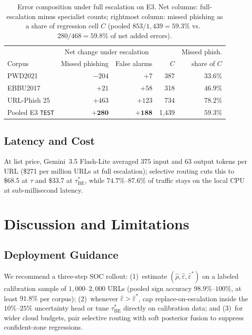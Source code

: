 \documentclass[conference,a4paper]{IEEEtran}
\newcommand{\eps}{\varepsilon}
\newcommand{\rrescue}{\rho}
\begin{document}
\begin{table}[!t]
\caption{Error composition under full escalation on E3. Net columns: full-escalation
minus specialist counts; rightmost column: missed phishing as a share of regression
cell $C$ (pooled $853/1{,}439=59.3\%$ vs.\ $280/468=59.8\%$ of net added errors).}
\label{tab:cell_c}
\centering
\scriptsize
\setlength{\tabcolsep}{3.2pt}
\begin{tabular}{lrrrr}
\toprule
& \multicolumn{2}{c}{Net change under escalation} & & Missed phish. \\
\cmidrule(lr){2-3}
Corpus & Missed phishing & False alarms & $C$ & share of $C$ \\
\midrule
PWD2021 & $-204$ & $+7$ & 387 & $33.6\%$ \\
EBBU2017 & $+21$ & $+58$ & 318 & $46.9\%$ \\
URL-Phish 25 & $+463$ & $+123$ & 734 & $\mathbf{78.2\%}$ \\
\midrule
Pooled E3 \texttt{TEST} & $\mathbf{+280}$ & $\mathbf{+188}$ & 1{,}439 & $59.3\%$ \\
\bottomrule
\end{tabular}
\end{table}

\subsection{Latency and Cost}
At list price, Gemini~3.5 Flash-Lite averaged $375$ input and $63$ output tokens per
URL (\$271 per million URLs at full escalation); selective routing cuts this to
\$68.5 at $\tau$ and \$33.7 at $\tau^{\ast}_{\mathrm{BE}}$, while $74.7\%$--$87.6\%$
of traffic stays on the local CPU at sub-millisecond latency.

\section{Discussion and Limitations}
\label{sec:discussion}
\subsection{Deployment Guidance}
We recommend a three-step SOC rollout: (1)~estimate
$(\hat{\rrescue},\hat{\eps},\hat{\eps}^{\ast})$ on a labeled calibration sample of
$1{,}000$--$2{,}000$ URLs (pooled sign accuracy $98.9\%$--$100\%$, at least $91.8\%$
per corpus); (2)~whenever $\hat{\eps}>\hat{\eps}^{\ast}$, cap replace-on-escalation
inside the $10\%$--$25\%$ uncertainty head or tune $\tau^{\ast}_{\mathrm{BE}}$
directly on calibration data; and (3)~for wider cloud budgets, pair selective
routing with soft posterior fusion to suppress confident-zone regressions.
\end{document}
